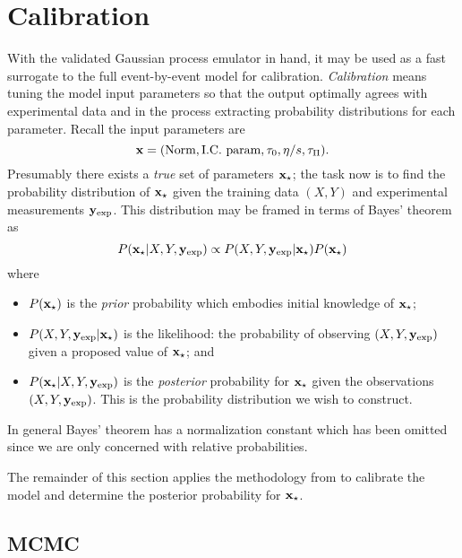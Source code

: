\documentclass[aps,prc,reprint,amsmath]{revtex4-1}
\begin{document}
\section{Calibration}

\newcommand{\xs}{\x_\star}
\newcommand{\z}{\mathbf z}
\newcommand{\yexp}{\y_\text{exp}}
\newcommand{\zexp}{\z_\text{exp}}

With the validated Gaussian process emulator in hand, it may be used as a fast surrogate to the full event-by-event model for calibration.
\emph{Calibration} means tuning the model input parameters so that the output optimally agrees with experimental data and in the process extracting probability distributions for each parameter.
Recall the input parameters are
\begin{equation*}
  \mathbf x = (\text{Norm}, \text{I.C.\ param}, \tau_0, \eta/s, \tau_\Pi).
\end{equation*}
Presumably there exists a \emph{true} set of parameters $\xs$; the task now is to find the probability distribution of $\xs$ given the training data $(X, Y)$ and experimental measurements $\yexp$.
This distribution may be framed in terms of Bayes' theorem as
\begin{equation}
  P(\xs|X,Y,\yexp) \propto P(X,Y,\yexp|\xs) P(\xs)
\end{equation}
where
\begin{itemize}
  \item $P(\xs)$ is the \emph{prior} probability which embodies initial knowledge of $\xs$;
  \item $P(X,Y,\yexp|\xs)$ is the likelihood:
    the probability of observing $(X, Y, \yexp)$ given a proposed value of $\xs$; and
  \item $P(\xs|X,Y,\yexp)$ is the \emph{posterior} probability for $\xs$ given the observations $(X, Y, \yexp)$.
    This is the probability distribution we wish to construct.
\end{itemize}
In general Bayes' theorem has a normalization constant which has been omitted since we are only concerned with relative probabilities.

The remainder of this section applies the methodology from \cite{OHagan:2006ba,Higdon:2008cmc,Higdon:2014tva} to calibrate the model and determine the posterior probability for $\xs$.

\subsection{MCMC}
\end{document}
